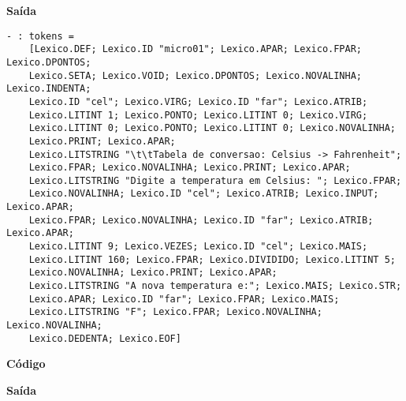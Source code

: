 \documentclass[hidelinks,12pt]{article}
\begin{document}
	{\large \textbf{Saída}}
	
	\begin{lstlisting}[caption=Analisador Léxico]
	- : tokens =
	[Lexico.DEF; Lexico.ID "micro01"; Lexico.APAR; Lexico.FPAR; Lexico.DPONTOS;
	Lexico.SETA; Lexico.VOID; Lexico.DPONTOS; Lexico.NOVALINHA; Lexico.INDENTA;
	Lexico.ID "cel"; Lexico.VIRG; Lexico.ID "far"; Lexico.ATRIB;
	Lexico.LITINT 1; Lexico.PONTO; Lexico.LITINT 0; Lexico.VIRG;
	Lexico.LITINT 0; Lexico.PONTO; Lexico.LITINT 0; Lexico.NOVALINHA;
	Lexico.PRINT; Lexico.APAR;
	Lexico.LITSTRING "\t\tTabela de conversao: Celsius -> Fahrenheit";
	Lexico.FPAR; Lexico.NOVALINHA; Lexico.PRINT; Lexico.APAR;
	Lexico.LITSTRING "Digite a temperatura em Celsius: "; Lexico.FPAR;
	Lexico.NOVALINHA; Lexico.ID "cel"; Lexico.ATRIB; Lexico.INPUT; Lexico.APAR;
	Lexico.FPAR; Lexico.NOVALINHA; Lexico.ID "far"; Lexico.ATRIB; Lexico.APAR;
	Lexico.LITINT 9; Lexico.VEZES; Lexico.ID "cel"; Lexico.MAIS;
	Lexico.LITINT 160; Lexico.FPAR; Lexico.DIVIDIDO; Lexico.LITINT 5;
	Lexico.NOVALINHA; Lexico.PRINT; Lexico.APAR;
	Lexico.LITSTRING "A nova temperatura e:"; Lexico.MAIS; Lexico.STR;
	Lexico.APAR; Lexico.ID "far"; Lexico.FPAR; Lexico.MAIS;
	Lexico.LITSTRING "F"; Lexico.FPAR; Lexico.NOVALINHA; Lexico.NOVALINHA;
	Lexico.DEDENTA; Lexico.EOF]
	\end{lstlisting}
	
	
	{\large \textbf{Código} }
			
	
	{\large \textbf{Saída}}
	
\end{document}
